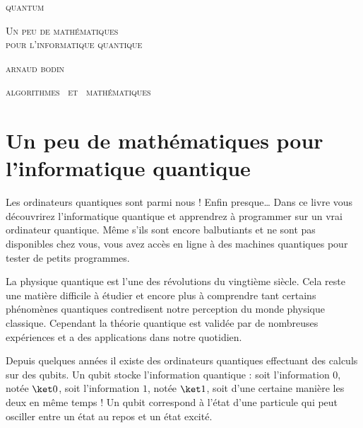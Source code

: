 
\pagestyle{empty}\thispagestyle{empty}
\vspace*{\fill}
\vspace*{5ex}
\begin{center}
	\fontsize{40}{40}\selectfont
	\textsc{quantum}
	
	\vspace*{1ex}
	\textsc{\fontsize{24}{24}\selectfont 
	Un peu de mathématiques  \\[-1.5ex]
	pour l'informatique quantique
	}
	
	\vspace*{2ex}
	
	\Large
	\textsc{arnaud bodin}

\end{center}
\vfill
\begin{center}
	\Large
	\textsc{algorithmes \  et \  mathématiques}
\end{center}
\begin{center}
\end{center}

\clearemptydoublepage

\thispagestyle{empty}

\vspace*{\fill}
\section*{Un peu de mathématiques pour l'informatique quantique}


Les ordinateurs quantiques sont parmi nous ! Enfin presque\ldots{}
Dans ce livre vous découvrirez l'informatique quantique et apprendrez à programmer sur un vrai ordinateur quantique.
Même s'ils sont encore balbutiants et ne sont pas disponibles chez vous, vous avez accès en ligne à des machines quantiques pour tester de petits programmes. 

\smallskip

La physique quantique est l'une des révolutions du vingtième siècle. Cela reste une matière difficile à étudier et encore plus à comprendre tant certains phénomènes quantiques contredisent notre perception du monde physique classique. Cependant la théorie quantique est validée par de nombreuses expériences et a des applications dans notre quotidien.

\smallskip

Depuis quelques années il existe des ordinateurs quantiques effectuant des calculs sur des \og{}qubits\fg{}.
Un qubit stocke l'information quantique : soit l'information $0$, notée $\ket0$, soit l'information $1$, notée $\ket1$, soit d'une certaine manière les deux en même temps ! Un qubit correspond à l'état d'une particule qui peut osciller entre un état au repos et un état excité.

